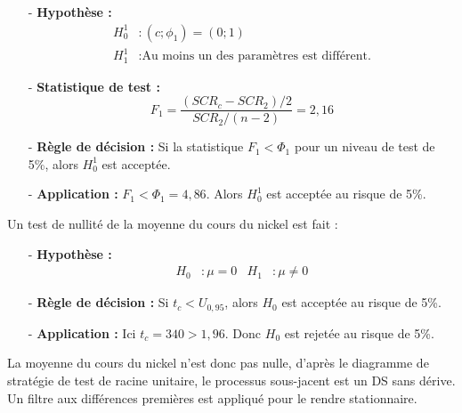 \begin{itemize}
\item[-]\textbf{Hypothèse :} 
\begin{equation*}
    \begin{split}
        H_{0}^{1} &: (c; \phi_{1}) = (0;1)\\
        H_{1}^{1} &: \text{Au moins un des paramètres est différent.}
    \end{split}
\end{equation*}
\item[-]\textbf{Statistique de test :}
\begin{equation*}
    F_{1} = \frac{(SCR_{c} - SCR_{2})/2}{SCR_{2}/(n-2)} = 2,16
\end{equation*}
\item[-]\textbf{Règle de décision :}  Si la statistique $F_{1} < \Phi_{1}$ pour un niveau de test de 5\%, alors $H_{0}^{1}$ est acceptée.
\item[-]\textbf{Application :} $F_{1} < \Phi_{1} = 4,86 $. Alors $H_{0}^{1}$ est acceptée au risque de 5\%.
\end{itemize}
%
Un test de nullité de la moyenne du cours du nickel est fait :
\begin{itemize}
    \item[-]\textbf{Hypothèse :}
\begin{align*}
    H_{0} &: \mu = 0 & H_{1} &: \mu \neq 0
\end{align*}
\item[-]\textbf{Règle de décision :} Si $t_{c} < U_{0,95}$, alors $H_{0}$ est acceptée au risque de 5\%.
\item[-]\textbf{Application :} Ici $t_{c} = 340 > 1,96 $. Donc $H_{0}$ est rejetée au risque de 5\%.
\end{itemize}
La moyenne du cours du nickel n'est donc pas nulle, d'après le diagramme de stratégie de test de racine unitaire, le processus sous-jacent est un DS sans dérive. Un filtre 
aux différences premières est appliqué pour le rendre stationnaire.
